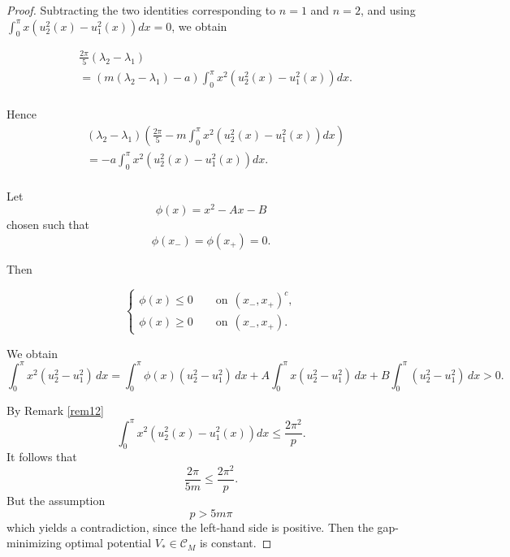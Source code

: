 \documentclass[12pt,a4paper]{amsart}
\newtheorem{rem}{Remark}[section]
\begin{document}
\begin{proof}
\noindent  Subtracting the two identities corresponding to $n=1$ and $n=2$, and using $
\int_0^{\pi}x(u_2^2(x)-u_1^2(x))dx =0$, we obtain

\begin{align*}
&  
\frac{2\pi}{5}(\lambda_2-\lambda_1)\\
&=\left(m(\lambda_2-\lambda_1) -a\right)\int_0^{\pi}x^2(u_2^2(x) -u^2_1(x))dx.\\
\end{align*}

\noindent Hence
\begin{align*}
&  
(\lambda_2-\lambda_1)  \left(\frac{2\pi}{5}-m\int_0^{\pi}x^2(u_2^2(x) -u^2_1(x))dx\right)\\
&=-a\int_0^{\pi}x^2(u_2^2(x) -u^2_1(x))dx.\\
\end{align*}


\noindent Let
\[
\phi(x) = x^2 - Ax - B
\]
\noindent chosen such that
\[
\phi(x_-) = \phi(x_+) = 0.
\]

\noindent Then


$$\displaystyle  \left\{%
    \begin{array}{ll}
   
   \phi(x) \leqslant  0 \qquad\text{on}~~(x_-,x_+)^c,
   \\
   \phi(x)\geqslant 0 \qquad\text{on}~~(x_-,x_+).                                                                                      \end{array}                                                                                \right.$$

\noindent We obtain
\[
\int_0^\pi x^2 (u_2^2 - u_1^2)\,dx
= \int_0^\pi \phi(x)(u_2^2 - u_1^2)\,dx
+ A \int_0^\pi x(u_2^2 - u_1^2)\,dx
+ B \int_0^\pi (u_2^2 - u_1^2)\,dx>0.
\]

\noindent By Remark \ref{rem12} \[
\int_0^{\pi}x^2(u_2^2(x) -u^2_1(x))dx\leq\frac{2\pi^2}{p}.
\]
It follows that \[\frac{2\pi}{5m}
\leq 
 \frac{2\pi^2}{p}.
\]
But the assumption
\[
p>5m\pi
\]
which yields a contradiction, since the left-hand side is positive. Then the gap-minimizing
optimal potential $V_{*} \in \mathcal{C}_M $ is constant.
\end{proof}  

\end{document}
